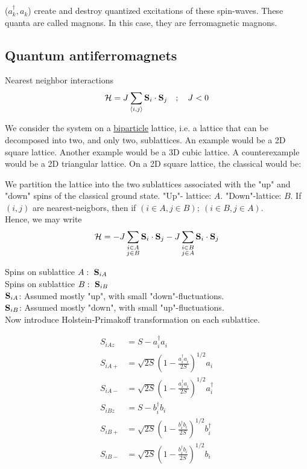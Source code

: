 
($a_k^\dagger, a_k^{}$) create and destroy quantized excitations of these spin-waves. These quanta are called magnons. In this case, they are ferromagnetic magnons.

\subsection{Quantum antiferromagnets}

Nearest neighbor interactions
\begin{equation}
    \mathcal{H} = J \sum_{\langle i, j \rangle}\vb{S}_i\cdot\vb{S}_j \quad ; \quad J < 0
\end{equation}

We consider the system on a \uline{biparticle} lattice, i.e. a lattice that can be decomposed into two, and only two, sublattices. An example would be a 2D square lattice. Another example would be a 3D cubic lattice. A counterexample would be a 2D triangular lattice. On a 2D square lattice, the classical would be:\\


We partition the lattice into the two sublattices associated with the "up" and "down" spins of the classical ground state. "Up"- lattice: $A$. "Down"-lattice: $B$. If $(i, j)$ are nearest-neigbors, then if $(i \in A, j \in B); \ (i \in B, j \in A)$. \\
 Hence, we may write
\begin{equation}
    \mathcal{H} = - J \sum_{\substack{i \in A \\ j \in B}} \vb{S}_i \cdot \vb{S}_j - J \sum_{\substack{i \in B \\ j \in A}} \vb{S}_i \cdot \vb{S}_j
\end{equation}

Spins on sublattice $A: \ \vb{S}_{iA}$ \\
Spins on sublattice $B: \ \vb{S}_{iB}$ \\
$\vb{S}_{iA}$: Assumed mostly "up", with small "down"-fluctuations. \\
$\vb{S}_{iB}$: Assumed mostly "down", with small "up"-fluctuations. \\

Now introduce Holstein-Primakoff transformation on each sublattice.

\begin{align}
    S_{iAz} &= S - a_i^\dagger a_i^{} \\
    S_{iA+} &= \sqrt{2S} \left (1- \frac{a_i^\dagger a_i^{}}{2S}\right )^{1/2} a_i \\
    S_{iA-} &= \sqrt{2S} \left (1- \frac{a_i^\dagger a_i^{}}{2S}\right )^{1/2} a_i^\dagger \\
    S_{iBz} &= S - b_i^\dagger b_i^{} \\
    S_{iB+} &= \sqrt{2S} \left (1- \frac{b_i^\dagger b_i^{}}{2S}\right )^{1/2} b_i^\dagger \\
    S_{iB-} &= \sqrt{2S} \left (1- \frac{b_i^\dagger b_i^{}}{2S}\right )^{1/2} b_i \\
\end{align}

